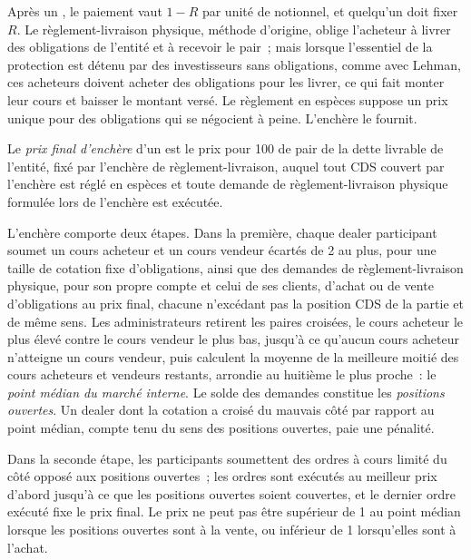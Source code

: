 Après un , le paiement vaut $1 - R$ par unité de notionnel, et quelqu'un doit
fixer $R$. Le règlement-livraison physique, méthode d'origine, oblige l'acheteur à livrer des obligations de
l'entité et à recevoir le pair~; mais lorsque l'essentiel de la protection est détenu par des investisseurs sans obligations, comme
avec Lehman, ces acheteurs doivent acheter des obligations pour les livrer, ce qui fait monter leur cours et baisser le montant versé.
Le règlement en espèces suppose un prix unique pour des obligations qui se négocient à peine. L'enchère
le fournit.

\begin{definition}\label{def:m2:credit-default-swaps:final}
Le \emph{prix final d'enchère} d'un  est le
prix pour 100 de pair de la dette livrable de l'entité, fixé par l'enchère de
règlement-livraison, auquel tout CDS couvert par l'enchère est réglé en espèces et toute
demande de règlement-livraison physique formulée lors de l'enchère est exécutée.
\end{definition}

L'enchère comporte deux étapes. Dans la première, chaque dealer participant soumet un cours acheteur
et un cours vendeur écartés de 2 au plus, pour une taille de cotation fixe d'obligations, ainsi que
des demandes de règlement-livraison physique, pour son propre compte et celui de ses clients, d'achat ou de vente d'obligations au
prix final, chacune n'excédant pas la position CDS de la partie et de même sens.
Les administrateurs retirent les paires croisées, le cours acheteur le plus élevé contre le cours vendeur le plus bas, jusqu'à ce qu'aucun
cours acheteur n'atteigne un cours vendeur, puis calculent la moyenne de la meilleure moitié des cours acheteurs et vendeurs restants,
arrondie au huitième le plus proche~: le \emph{point médian du marché interne}. Le solde des
demandes constitue les \emph{positions ouvertes}. Un dealer dont la cotation a croisé du mauvais côté
par rapport au point médian, compte tenu du sens des positions ouvertes, paie une pénalité.

Dans la seconde étape, les participants soumettent des ordres à cours limité du côté opposé aux
positions ouvertes~; les ordres sont exécutés au meilleur prix d'abord jusqu'à ce que les
positions ouvertes soient couvertes, et le dernier ordre exécuté fixe le prix final. Le prix ne peut pas être supérieur de 1 au
point médian lorsque les positions ouvertes sont à la vente, ou inférieur de 1 lorsqu'elles sont à l'achat.

